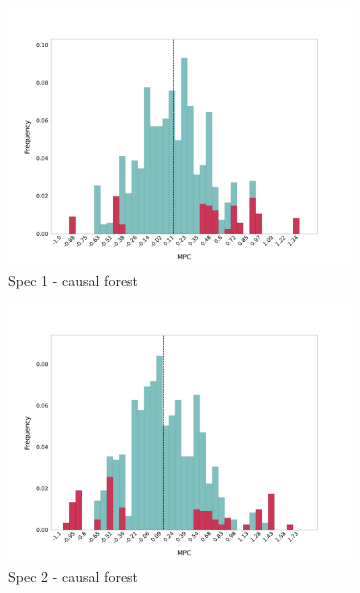 \begin{figure}[t]
    \begin{subfigure}{0.33\linewidth}
        \includegraphics[width=\linewidth]{figures/distributions/spec1_cf_chSNDexp.png}
        \caption{Spec 1 - causal forest }
    \end{subfigure}\hfill
    \begin{subfigure}{0.33\linewidth}
        \includegraphics[width=\linewidth]{figures/distributions/spec2_cf_chSNDexp.png}
        \caption{Spec 2 - causal forest }
    \end{subfigure}\hfill
    \begin{subfigure}{0.33\linewidth}

\end{subfigure}
\end{figure}
